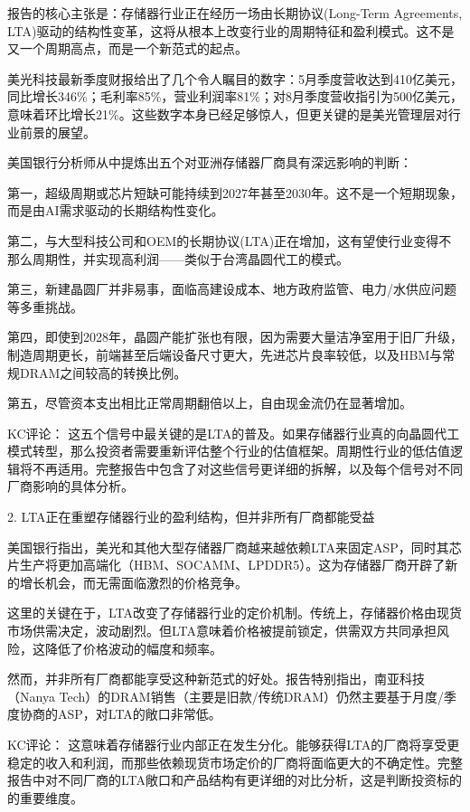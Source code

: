 \documentclass[11pt]{ctexart}
\begin{document}
报告的核心主张是：存储器行业正在经历一场由长期协议(Long-Term Agreements, LTA)驱动的结构性变革，这将从根本上改变行业的周期特征和盈利模式。这不是又一个周期高点，而是一个新范式的起点。

美光科技最新季度财报给出了几个令人瞩目的数字：5月季度营收达到410亿美元，同比增长346\%；毛利率85\%，营业利润率81\%；对8月季度营收指引为500亿美元，意味着环比增长21\%。这些数字本身已经足够惊人，但更关键的是美光管理层对行业前景的展望。

美国银行分析师从中提炼出五个对亚洲存储器厂商具有深远影响的判断：

第一，超级周期或芯片短缺可能持续到2027年甚至2030年。这不是一个短期现象，而是由AI需求驱动的长期结构性变化。

第二，与大型科技公司和OEM的长期协议(LTA)正在增加，这有望使行业变得不那么周期性，并实现高利润——类似于台湾晶圆代工的模式。

第三，新建晶圆厂并非易事，面临高建设成本、地方政府监管、电力/水供应问题等多重挑战。

第四，即使到2028年，晶圆产能扩张也有限，因为需要大量洁净室用于旧厂升级，制造周期更长，前端甚至后端设备尺寸更大，先进芯片良率较低，以及HBM与常规DRAM之间较高的转换比例。

第五，尽管资本支出相比正常周期翻倍以上，自由现金流仍在显著增加。

KC评论： 这五个信号中最关键的是LTA的普及。如果存储器行业真的向晶圆代工模式转型，那么投资者需要重新评估整个行业的估值框架。周期性行业的低估值逻辑将不再适用。完整报告中包含了对这些信号更详细的拆解，以及每个信号对不同厂商影响的具体分析。

2. LTA正在重塑存储器行业的盈利结构，但并非所有厂商都能受益

美国银行指出，美光和其他大型存储器厂商越来越依赖LTA来固定ASP，同时其芯片生产将更加高端化（HBM、SOCAMM、LPDDR5）。这为存储器厂商开辟了新的增长机会，而无需面临激烈的价格竞争。

这里的关键在于，LTA改变了存储器行业的定价机制。传统上，存储器价格由现货市场供需决定，波动剧烈。但LTA意味着价格被提前锁定，供需双方共同承担风险，这降低了价格波动的幅度和频率。

然而，并非所有厂商都能享受这种新范式的好处。报告特别指出，南亚科技（Nanya Tech）的DRAM销售（主要是旧款/传统DRAM）仍然主要基于月度/季度协商的ASP，对LTA的敞口非常低。

KC评论： 这意味着存储器行业内部正在发生分化。能够获得LTA的厂商将享受更稳定的收入和利润，而那些依赖现货市场定价的厂商将面临更大的不确定性。完整报告中对不同厂商的LTA敞口和产品结构有更详细的对比分析，这是判断投资标的的重要维度。
\end{document}
